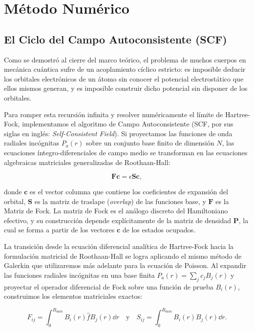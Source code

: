 \chapter{Método Numérico}
\label{ch:metodo}

\section{El Ciclo del Campo Autoconsistente (SCF)}

Como se demostró al cierre del marco teórico, el problema de muchos cuerpos en mecánica cuántica sufre de un acoplamiento cíclico estricto: es imposible deducir los orbitales electrónicos de un átomo sin conocer el potencial electrostático que ellos mismos generan, y es imposible construir dicho potencial sin disponer de los orbitales. 

Para romper esta recursión infinita y resolver numéricamente el límite de Hartree-Fock, implementamos el algoritmo de Campo Autoconsistente (SCF, por sus siglas en inglés: \textit{Self-Consistent Field}). Si proyectamos las funciones de onda radiales incógnitas $P_a(r)$ sobre un conjunto base finito de dimensión $N$, las ecuaciones íntegro-diferenciales de campo medio se transforman en las ecuaciones algebraicas matriciales generalizadas de Roothaan-Hall:

\begin{equation}
  \bm{F}\bm{c} = \epsilon\bm{S}\bm{c},
\end{equation}

donde $\bm{c}$ es el vector columna que contiene los coeficientes de expansión del orbital, $\bm{S}$ es la matriz de traslape (\textit{overlap}) de las funciones base, y $\bm{F}$ es la Matriz de Fock. La matriz de Fock es el análogo discreto del Hamiltoniano efectivo, y su construcción depende explícitamente de la matriz de densidad $\bm{P}$, la cual se forma a partir de los vectores $\bm{c}$ de los estados ocupados.

La transición desde la ecuación diferencial analítica de Hartree-Fock hacia la formulación matricial de Roothaan-Hall se logra aplicando el mismo método de Galerkin que utilizaremos más adelante para la ecuación de Poisson. Al expandir las funciones radiales incógnitas en una base finita $P_a(r) = \sum_j c_j B_j(r)$ y proyectar el operador diferencial de Fock sobre una función de prueba $B_i(r)$, construimos los elementos matriciales exactos:

\begin{equation}
  F_{ij} = \int_0^{R_{\text{max}}} B_i(r) \hat{f} B_j(r) \dd{r} \quad \text{y} \quad S_{ij} = \int_0^{R_{\text{max}}} B_i(r) B_j(r) \dd{r}.
\end{equation}

